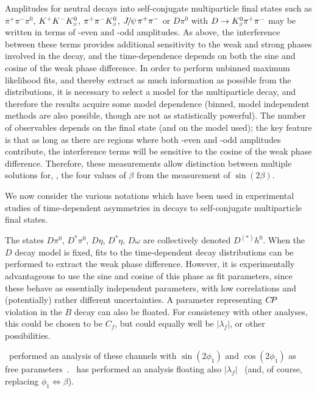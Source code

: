 Amplitudes for neutral \B decays into 
self-conjugate multiparticle final states
such as $\pi^+\pi^-\pi^0$, $K^+K^-K^0_{\scriptscriptstyle S}$, $\pi^+\pi^-K^0_{\scriptscriptstyle S}$,
${J\mskip -3mu/\mskip -2mu\psi\mskip 2mu} \pi^+\pi^-$ or $D\pi^0$ with $D \to K^0_{\scriptscriptstyle S}\pi^+\pi^-$
may be written in terms of \CP-even and \CP-odd amplitudes.
As above, the interference between these terms 
provides additional sensitivity to the weak and strong phases
involved in the decay,
and the time-dependence depends on both the sine and cosine
of the weak phase difference.
In order to perform unbinned maximum likelihood fits,
and thereby extract as much information as possible from the distributions,
it is necessary to select a model for the multiparticle decay,
and therefore the results acquire some model dependence
(binned, model independent methods are also possible,
though are not as statistically powerful).
The number of observables depends on the final state (and on the model used);
the key feature is that as long as there are regions where both
\CP-even and \CP-odd amplitudes contribute,
the interference terms will be sensitive to the cosine 
of the weak phase difference.
Therefore, these measurements allow distinction between multiple solutions
for, \eg, the four values of $\beta$ from the measurement of $\sin(2\beta)$.

We now consider the various notations which have been used 
in experimental studies of
time-dependent asymmetries in decays to self-conjugate multiparticle final states.

\label{sec:cp_uta:notations:dalitz:dh0}

The states $D\pi^0$, $D^*\pi^0$, $D\eta$, $D^*\eta$, $D\omega$
are collectively denoted $D^{(*)}h^0$.
When the $D$ decay model is fixed,
fits to the time-dependent decay distributions can be performed
to extract the weak phase difference.
However, it is experimentally advantageous to use the sine and cosine of 
this phase as fit parameters, since these behave as essentially 
independent parameters, with low correlations and (potentially)
rather different uncertainties.
A parameter representing $C\!P$ violation in the $B$ decay 
can also be floated.  
For consistency with other analyses, this could be chosen to be $C_f$,
but could equally well be $\left| \lambda_f \right|$, or other possibilities.

\belle\ performed an analysis of these channels
with $\sin(2\phi_1)$ and $\cos(2\phi_1)$ as free parameters~\cite{Krokovny:2006sv}.
\babar\ has performed an analysis floating also $\left| \lambda_f \right|$~\cite{Aubert:2007rp}
(and, of course, replacing $\phi_1 \Leftrightarrow \beta$).

